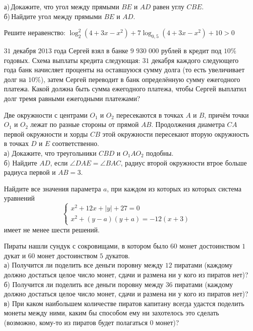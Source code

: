 \begin{training}[2]
\begin{listofex}
		а) Докажите, что угол между прямыми \( BE \) и \( AD \) равен углу \( CBE \).\\		
		б) Найдите угол между прямыми \( BE \) и \( AD \).
		\item Решите неравенство: \( \log^2_2(4+3x-x^2)+7\log_{0,5}(4+3x-x^2)+10>0 \)
		\item \( 31 \) декабря \( 2013 \) года Сергей взял в банке \( 9 \) \(930\) \(000\) рублей в кредит под \( 10\% \) годовых. Схема выплаты кредита следующая: \( 31 \) декабря каждого следующего года банк начисляет проценты на оставшуюся сумму долга (то есть увеличивает долг на \( 10\% \)), затем Сергей переводит в банк определённую сумму ежегодного платежа. Какой должна быть сумма ежегодного платежа, чтобы Сергей выплатил долг тремя равными ежегодными платежами?
		\item Две окружности с центрами \( O_1 \) и \( O_2 \) пересекаются в точках \( A \) и \( B \), причём точки \( O_1 \) и \( O_2 \) лежат по разные стороны от прямой \( AB \). Продолжения диаметра \( CA \) первой окружности и хорды \( CB \) этой окружности пересекают вторую окружность в точках \( D \) и \( E \) соответственно. \\
		а) Докажите, что треугольники \( CBD \) и \( O_1AO_2 \) подобны.\\
		б) Найдите \( AD \), если \( \angle DAE=\angle BAC \), радиус второй окружности втрое больше радиуса первой и \( AB=3 \).
		\item Найдите все значения параметра \( a \), при каждом из которых из которых система уравнений
		\[\begin{cases} x^2+12x+|y|+27=0 \\ x^2+(y-a)(y+a)=-12(x+3) \end{cases}\]
		имеет не менее шести решений.
		\newpage
		\item Пираты нашли сундук с сокровищами, в котором было \( 60 \) монет достоинством \( 1 \) дукат и \( 60  \) монет достоинством \( 5 \) дукатов.\\
		а) Получится ли поделить все деньги поровну между \( 12 \) пиратами (каждому должно достаться целое число монет, сдачи и размена ни у кого из пиратов нет)?\\
		б) Получится ли поделить все деньги поровну между \( 36 \) пиратами (каждому должно достаться целое число монет, сдачи и размена ни у кого из пиратов нет)?\\
		в) При каком наибольшем количестве пиратов капитану всегда удастся поделить монеты между ними, каким бы способом ему ни захотелось это сделать (возможно, кому-то из пиратов будет полагаться \( 0 \) монет)?
	\end{listofex}
\end{training}
